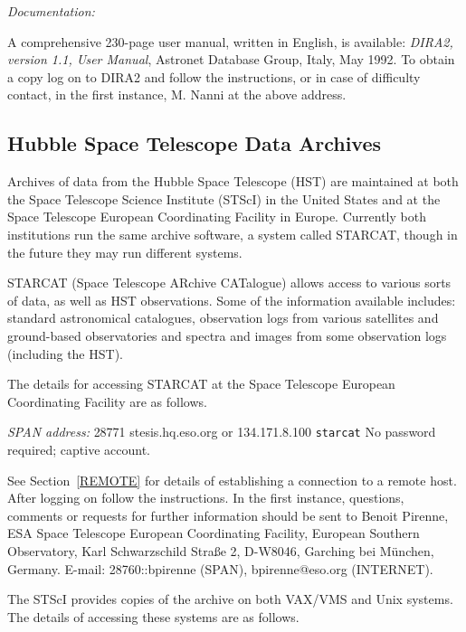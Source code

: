 \documentclass[twoside,11pt]{article}
\newcommand{\xlabel}[1]{}
\begin{document}
{\it Documentation:}

A comprehensive 230-page user manual, written in English, is available:
{\it DIRA2, version 1.1, User Manual}, Astronet Database Group, Italy,
May 1992. To obtain a copy log on to DIRA2 and follow the instructions,
or in case of difficulty contact, in the first instance, M. Nanni at
the above address.

\subsection{Hubble Space Telescope Data Archives
\xlabel{hubble_space_telescope_data_archives}}

Archives of data from the Hubble Space Telescope (HST) are maintained at
both the Space Telescope Science Institute (STScI) in the United States
and at the Space Telescope European Coordinating Facility in Europe.
Currently both institutions run the same archive software, a system
called STARCAT, though in the future they may run different systems.

STARCAT (Space Telescope ARchive CATalogue) allows access to various
sorts of data, as well as HST observations. Some of the information
available includes: standard astronomical catalogues, observation logs
from various satellites and ground-based observatories and spectra
and images from some observation logs (including the HST).

The details for accessing STARCAT at the Space Telescope European
Coordinating Facility are as follows.

{\it SPAN address: } 28771
 stesis.hq.eso.org or 134.171.8.100
 \verb-starcat-
 No password required; captive account.

See Section~\ref{REMOTE} for details of establishing a connection to
a remote host. After logging on follow the instructions. In the first
instance, questions, comments or requests for further information should
be sent to Benoit Pirenne, ESA Space Telescope European Coordinating
Facility, European Southern Observatory, Karl Schwarzschild Stra\ss e 2,
D-W8046, Garching bei M\"{u}nchen, Germany. E-mail: 28760::bpirenne
(SPAN), bpirenne@eso.org (INTERNET).

The STScI provides copies of the archive on both VAX/VMS and Unix
systems. The details of accessing these systems are as follows.
\end{document}
